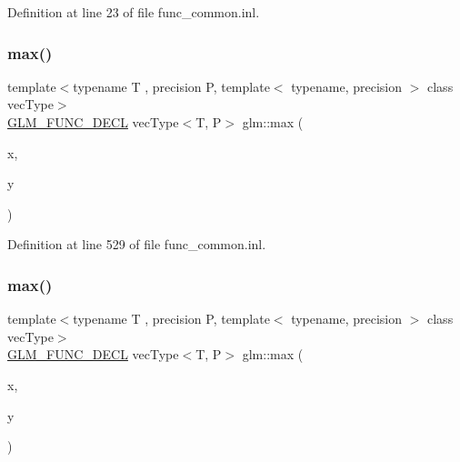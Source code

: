 Definition at line 23 of file func\+\_\+common.\+inl.

\mbox{\label{group__core__func__common_ga1a31d3f13a4bd0aa9828e263b7ac5896}} 
\subsubsection{\texorpdfstring{max()}{max()}\hspace{0.1cm}{\footnotesize\ttfamily [2/3]}}
{\footnotesize\ttfamily template$<$typename T , precision P, template$<$ typename, precision $>$ class vec\+Type$>$ \\
\mbox{\hyperlink{setup_8hpp_ab2d052de21a70539923e9bcbf6e83a51}{G\+L\+M\+\_\+\+F\+U\+N\+C\+\_\+\+D\+E\+CL}} vec\+Type$<$T, P$>$ glm\+::max (\begin{DoxyParamCaption}\item[{vec\+Type$<$ T, P $>$ const \&}]{x,  }\item[{T}]{y }\end{DoxyParamCaption})}



Definition at line 529 of file func\+\_\+common.\+inl.

\mbox{\label{group__core__func__common_gad2ac6877ac7872a402ef5cae9bc6a30b}} 
\subsubsection{\texorpdfstring{max()}{max()}\hspace{0.1cm}{\footnotesize\ttfamily [3/3]}}
{\footnotesize\ttfamily template$<$typename T , precision P, template$<$ typename, precision $>$ class vec\+Type$>$ \\
\mbox{\hyperlink{setup_8hpp_ab2d052de21a70539923e9bcbf6e83a51}{G\+L\+M\+\_\+\+F\+U\+N\+C\+\_\+\+D\+E\+CL}} vec\+Type$<$T, P$>$ glm\+::max (\begin{DoxyParamCaption}\item[{vec\+Type$<$ T, P $>$ const \&}]{x,  }\item[{vec\+Type$<$ T, P $>$ const \&}]{y }\end{DoxyParamCaption})}



